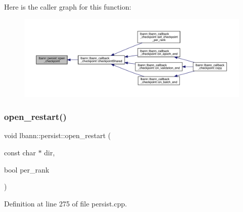 Here is the caller graph for this function\+:\nopagebreak
\begin{figure}[H]
\begin{center}
\leavevmode
\includegraphics[width=350pt]{classlbann_1_1persist_a32a8f71995b674a62b21087ec4be9575_icgraph}
\end{center}
\end{figure}
\mbox{\label{classlbann_1_1persist_a123cbc1d2b693640c784a45cbc6d2d97}} 
\subsubsection{\texorpdfstring{open\+\_\+restart()}{open\_restart()}}
{\footnotesize\ttfamily void lbann\+::persist\+::open\+\_\+restart (\begin{DoxyParamCaption}\item[{const char $\ast$}]{dir,  }\item[{bool}]{per\+\_\+rank }\end{DoxyParamCaption})}



Definition at line 275 of file persist.\+cpp.


